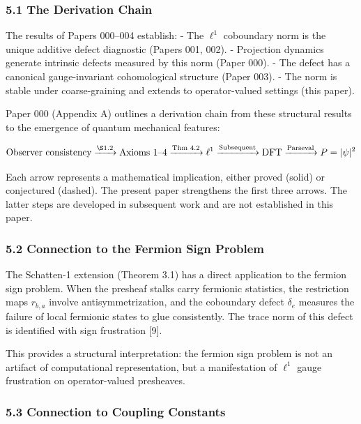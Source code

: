 \documentclass[
]{article}
\begin{document}
\subsubsection{5.1 The Derivation Chain}\label{the-derivation-chain}

The results of Papers 000--004 establish: - The \(\ell^1\) coboundary
norm is the unique additive defect diagnostic (Papers 001, 002). -
Projection dynamics generate intrinsic defects measured by this norm
(Paper 000). - The defect has a canonical gauge-invariant cohomological
structure (Paper 003). - The norm is stable under coarse-graining and
extends to operator-valued settings (this paper).

Paper 000 (Appendix A) outlines a derivation chain from these structural
results to the emergence of quantum mechanical features:

\[\text{Observer consistency} \xrightarrow{\S 1.2} \text{Axioms 1--4} \xrightarrow{\text{Thm 4.2}} \ell^1 \xrightarrow{\text{Subsequent}} \text{DFT} \xrightarrow{\text{Parseval}} P = |\psi|^2\]

Each arrow represents a mathematical implication, either proved (solid)
or conjectured (dashed). The present paper strengthens the first three
arrows. The latter steps are developed in subsequent work and are not
established in this paper.

\subsubsection{5.2 Connection to the Fermion Sign
Problem}\label{connection-to-the-fermion-sign-problem}

The Schatten-1 extension (Theorem 3.1) has a direct application to the
fermion sign problem. When the presheaf stalks carry fermionic
statistics, the restriction maps \(r_{b,a}\) involve antisymmetrization,
and the coboundary defect \(\delta_e\) measures the failure of local
fermionic states to glue consistently. The trace norm of this defect is
identified with sign frustration {[}9{]}.

This provides a structural interpretation: the fermion sign problem is
not an artifact of computational representation, but a manifestation of
\(\ell^1\) gauge frustration on operator-valued presheaves.

\subsubsection{5.3 Connection to Coupling
Constants}\label{connection-to-coupling-constants}
\end{document}

